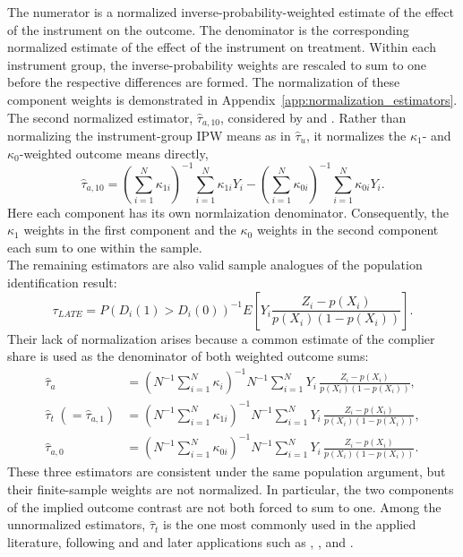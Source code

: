 \documentclass[12pt, a4paper, oneside]{article}
\theoremstyle{plain}
\theoremstyle{definition}
\begin{document}
The numerator is a normalized inverse-probability-weighted estimate of the effect of the instrument on the outcome.
The denominator is the corresponding normalized estimate of the effect of the instrument on treatment. Within each instrument group, the inverse-probability weights are rescaled to sum to one before the respective differences are formed. The normalization of these component weights is demonstrated in Appendix~\ref{app:normalization_estimators}.\\
The second normalized estimator, $\hat\tau_{a,10}$, considered by \citet{abadie2018econometric} and \citet{sant2022covariate}. Rather than normalizing the instrument-group IPW means as in \(\hat\tau_u\),
it normalizes the \(\kappa_1\)- and \(\kappa_0\)-weighted outcome means directly,
\begin{equation}
    \hat\tau_{a,10} =
    \left(\sum_{i=1}^N \kappa_{1i}\right)^{-1}\sum_{i=1}^N \kappa_{1i}Y_i
    -
    \left(\sum_{i=1}^N \kappa_{0i}\right)^{-1}\sum_{i=1}^N \kappa_{0i}Y_i.
    \label{eq:tau_a10}
\end{equation}
Here each component has its own normlaization denominator. 
Consequently, the $\kappa_1$ weights in the first component and the $\kappa_0$ weights in the second component each sum to one within the sample.\\
The remaining estimators are also valid sample analogues of the population identification result:
\[
\tau_{LATE}
= P(D_i(1)>D_i(0))^{-1}
E\!\left[
Y_i\frac{Z_i-p(X_i)}{p(X_i)(1-p(X_i))}
\right].
\]
Their lack of normalization arises because a common estimate of the complier share is used as the denominator of both weighted outcome sums:
\begin{align}
    \hat\tau_a &= \left(N^{-1}\sum_{i=1}^N \kappa_i\right)^{-1} N^{-1}\sum_{i=1}^N Y_i\,\frac{Z_i-p(X_i)}{p(X_i)(1-p(X_i))}, \label{eq:tau_a}\\
    \hat\tau_t \;(=\hat\tau_{a,1}) &= \left(N^{-1}\sum_{i=1}^N \kappa_{1i}\right)^{-1} N^{-1}\sum_{i=1}^N Y_i\,\frac{Z_i-p(X_i)}{p(X_i)(1-p(X_i))}, \label{eq:tau_t}\\
    \hat\tau_{a,0} &= \left(N^{-1}\sum_{i=1}^N \kappa_{0i}\right)^{-1} N^{-1}\sum_{i=1}^N Y_i\,\frac{Z_i-p(X_i)}{p(X_i)(1-p(X_i))}. \label{eq:tau_a0}
\end{align}
These three estimators are consistent under the same population argument, but
their finite-sample weights are not normalized. In particular, the two components
of the implied outcome contrast are not both forced to sum to one. 
Among the unnormalized estimators, $\hat\tau_t$ is the one most commonly used in
the applied literature, following \citet{tan2006regression} and
\citet{frolich2007nonparametric} and later applications such as
\citet{macurdy2011flexible},
\citet{donald2014inverse,donald2014testing}, and
\citet{abdulkadirouglu2017research}.
\end{document}

